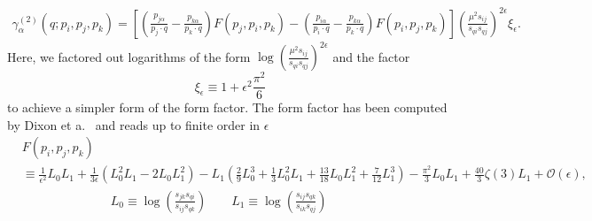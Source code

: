 \documentclass[a4paper,11pt]{article}
\begin{document}
\begin{equation}
\begin{split}
\gamma_\alpha^{(2)}(q; p_i, p_j, p_k) = \left[ \left(\frac{p_{j \alpha}}{p_j \cdot q} - \frac{p_{k \alpha}}{p_k \cdot q} \right) F(p_j, p_i, p_k) - \left(\frac{p_{i \alpha}}{p_i \cdot q} - \frac{p_{k \alpha}}{p_k \cdot q} \right) F(p_i, p_j, p_k)\right] \left(\frac{\mu^2 s_{ij}}{s_{qi} s_{qj}} \right)^{2 \epsilon} \xi_\epsilon.
\end{split}
\end{equation}
Here, we factored out logarithms of the form $\log\left(\frac{\mu^2 s_{ij}}{s_{qi} s_{qj}} \right)^{2 \epsilon}$ and the factor
\begin{equation}
\xi_\epsilon \equiv 1 + \epsilon^2 \frac{\pi^2}{6}
\end{equation}
to achieve a simpler form of the form factor. The form factor has been computed by Dixon et a.~\cite{Dixon:2019lnw} and reads up to finite order in $\epsilon$
\begin{equation}
\begin{split}
&F(p_i, p_j, p_k) \\
&\equiv \frac{1}{\epsilon^2} L_0 L_1 + \frac{1}{3 \epsilon} \left(L_0^2 L_1 - 2 L_0 L_1^2 \right) - L_1 \left(\frac{2}{9} L_0^3 + \frac{1}{3} L_0^2 L_1 + \frac{13}{18} L_0 L_1^2 + \frac{7}{12} L_1^3 \right) - \frac{\pi^2}{3} L_0 L_1  + \frac{40}{3} \zeta(3) L_1 + \mathcal{O}(\epsilon),  \\
& \hspace{3cm} L_0 \equiv \log\!\left(\frac{s_{jk} s_{qi}}{s_{ij} s_{q k}} \right) \qquad L_1 \equiv \log\!\left(\frac{s_{ij} s_{qk}}{ s_{ik} s_{qj}} \right)
\end{split}
\end{equation}
\end{document}
